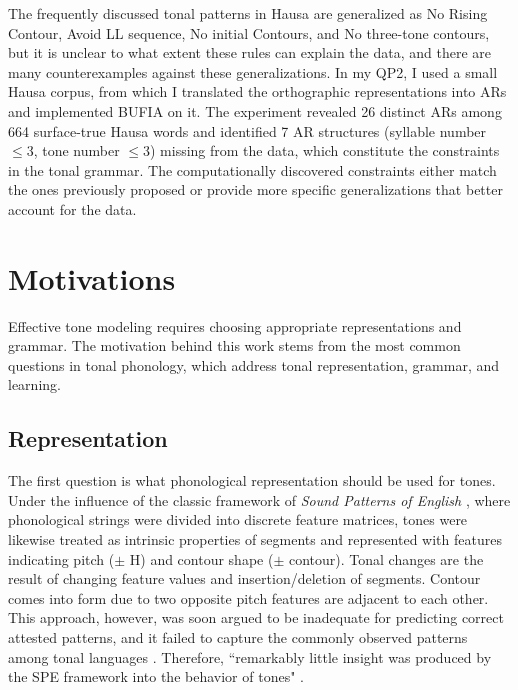 The frequently discussed tonal patterns in Hausa are generalized as No Rising Contour, Avoid LL sequence, No initial Contours, and No three-tone contours, but it is unclear to what extent these rules can explain the data, and there are many counterexamples against these generalizations.  In my QP2, I used a small Hausa corpus, from which I translated the orthographic representations into ARs and implemented BUFIA  on it. The experiment revealed 26 distinct ARs among 664 surface-true Hausa words and identified 7 AR structures (syllable number \(\leq 3 \), tone number \(\leq 3\)) missing from the data, which constitute the constraints in the tonal grammar. The computationally discovered constraints either match the ones previously proposed or provide more specific generalizations that better account for the data. 


\section{Motivations}

Effective tone modeling requires choosing appropriate representations and grammar. The motivation behind this work stems from the most common questions in tonal phonology, which address tonal representation, grammar, and learning.

\subsection{Representation}
The first question is what phonological representation should be used for tones. Under the influence of the classic framework of \textit{Sound Patterns of English} \citep{chomsky1968sound}, where phonological strings were divided into discrete feature matrices, tones were likewise treated as intrinsic properties of segments and represented with features indicating pitch ($\pm$ H) and contour shape ($\pm$ contour). Tonal changes are the result of changing feature values and insertion/deletion of segments. Contour comes into form due to two opposite pitch features are adjacent to each other. This approach, however, was soon argued to be inadequate for predicting correct attested patterns, and it failed to capture the commonly observed patterns among tonal languages \citep{hyman2008issues,oddenbook}. Therefore, ``remarkably little insight was produced by the SPE framework into the behavior of tones" \citep[p.8]{clements1984autosegmental}.

